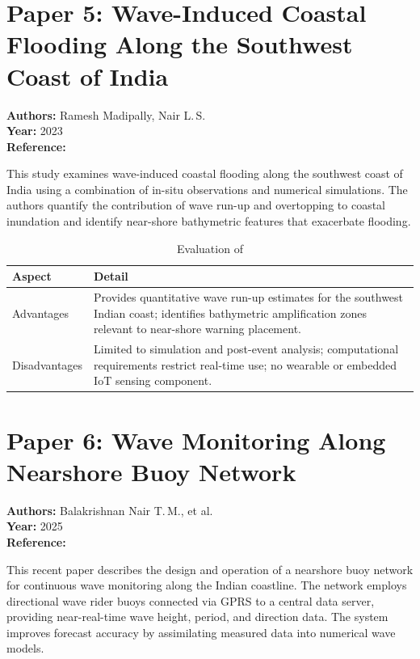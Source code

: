 \section{Paper 5: Wave-Induced Coastal Flooding Along the Southwest Coast of India}

\textbf{Authors:} Ramesh Madipally, Nair L.\,S.\\
\textbf{Year:} 2023\\
\textbf{Reference:} \cite{madipally2023wave}

This study examines wave-induced coastal flooding along the southwest coast of India
using a combination of in-situ observations and numerical simulations.
The authors quantify the contribution of wave run-up and overtopping to coastal
inundation and identify near-shore bathymetric features that exacerbate flooding.

\begin{table}[H]
\centering
\caption{Evaluation of \cite{madipally2023wave}}
\label{tab:paper5}
\begin{tabularx}{\textwidth}{lX}
\toprule
\textbf{Aspect} & \textbf{Detail} \\
\midrule
Advantages &
  Provides quantitative wave run-up estimates for the southwest Indian coast;
  identifies bathymetric amplification zones relevant to near-shore warning
  placement. \\
\addlinespace
Disadvantages &
  Limited to simulation and post-event analysis;
  computational requirements restrict real-time use;
  no wearable or embedded IoT sensing component. \\
\bottomrule
\end{tabularx}
\end{table}

\section{Paper 6: Wave Monitoring Along Nearshore Buoy Network}

\textbf{Authors:} Balakrishnan Nair T.\,M., et al.\\
\textbf{Year:} 2025\\
\textbf{Reference:} \cite{balakrishnannair2025buoy}

This recent paper describes the design and operation of a nearshore buoy network for
continuous wave monitoring along the Indian coastline.
The network employs directional wave rider buoys connected via GPRS to a central
data server, providing near-real-time wave height, period, and direction data.
The system improves forecast accuracy by assimilating measured data into numerical
wave models.

